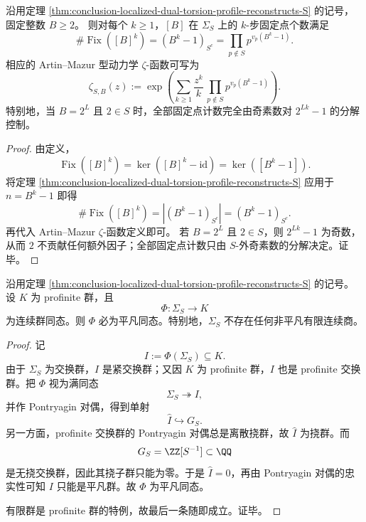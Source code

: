 \begin{corollary}\label{cor:conclusion-localized-dual-B-periodic-count-S-outside}
沿用定理 \ref{thm:conclusion-localized-dual-torsion-profile-reconstructs-S} 的记号，固定整数 \(B\ge 2\)。
则对每个 \(k\ge 1\)，\([B]\) 在 \(\Sigma_S\) 上的 \(k\)-步固定点个数满足
\[
\boxed{\;
\#\operatorname{Fix}([B]^k)
=
(B^k-1)_{S^c}
=
\prod_{p\notin S}p^{v_p(B^k-1)}.\;}
\]
相应的 Artin--Mazur 型动力学 \(\zeta\)-函数可写为
\[
\boxed{\;
\zeta_{S,B}(z)
:=
\exp\!\left(
\sum_{k\ge 1}\frac{z^k}{k}\,
\prod_{p\notin S}p^{v_p(B^k-1)}
\right).\;}
\]
特别地，当 \(B=2^L\) 且 \(2\in S\) 时，全部固定点计数完全由奇素数对 \(2^{Lk}-1\) 的分解控制。
\end{corollary}
\begin{proof}
由定义，
\[
\operatorname{Fix}([B]^k)=\ker([B]^k-\mathrm{id})=\ker([B^k-1]).
\]
将定理 \ref{thm:conclusion-localized-dual-torsion-profile-reconstructs-S} 应用于 \(n=B^k-1\) 即得
\[
\#\operatorname{Fix}([B]^k)=|(B^k-1)_{S^c}|=(B^k-1)_{S^c}.
\]
再代入 Artin--Mazur \(\zeta\)-函数定义即可。
若 \(B=2^L\) 且 \(2\in S\)，则 \(2^{Lk}-1\) 为奇数，从而 \(2\) 不贡献任何额外因子；全部固定点计数只由 \(S\)-外奇素数的分解决定。证毕。
\end{proof}

\begin{theorem}\label{thm:conclusion-localized-dual-no-profinite-hom}
沿用定理 \ref{thm:conclusion-localized-dual-torsion-profile-reconstructs-S} 的记号。设 \(K\) 为 profinite 群，且
\[
\Phi:\Sigma_S\longrightarrow K
\]
为连续群同态。则 \(\Phi\) 必为平凡同态。特别地，\(\Sigma_S\) 不存在任何非平凡有限连续商。
\end{theorem}
\begin{proof}
记
\[
I:=\Phi(\Sigma_S)\subseteq K.
\]
由于 \(\Sigma_S\) 为交换群，\(I\) 是紧交换群；又因 \(K\) 为 profinite 群，\(I\) 也是 profinite 交换群。把 \(\Phi\) 视为满同态
\[
\Sigma_S\twoheadrightarrow I,
\]
并作 Pontryagin 对偶，得到单射
\[
\widehat I\hookrightarrow G_S.
\]
另一方面，profinite 交换群的 Pontryagin 对偶总是离散挠群，故 \(\widehat I\) 为挠群。而
\[
G_S=\ZZ[S^{-1}]\subset \QQ
\]
是无挠交换群，因此其挠子群只能为零。于是 \(\widehat I=0\)，再由 Pontryagin 对偶的忠实性可知 \(I\) 只能是平凡群。故 \(\Phi\) 为平凡同态。

有限群是 profinite 群的特例，故最后一条随即成立。证毕。
\end{proof}

